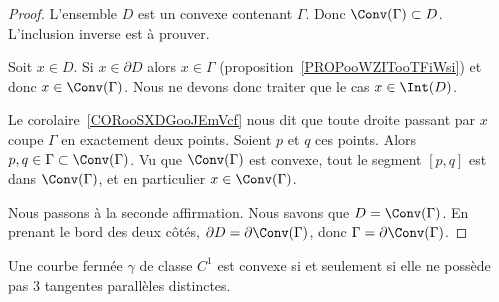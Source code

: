\begin{proof}
	L'ensemble \( D\) est un convexe contenant \( \Gamma\). Donc \( \Conv(\Gamma)\subset D\). L'inclusion inverse est à prouver.

	Soit \( x\in D\). Si \( x\in \partial D\) alors \( x\in \Gamma\) (proposition~\ref{PROPooWZITooTFiWsi}) et donc \( x\in\Conv(\Gamma)\). Nous ne devons donc traiter que le cas \( x\in\Int(D)\).

	Le corolaire~\ref{CORooSXDGooJEmVcf} nous dit que toute droite passant par \( x\) coupe \( \Gamma\) en exactement deux points. Soient \( p\) et \( q\) ces points. Alors \( p,q\in \Gamma\subset \Conv(\Gamma)\). Vu que \( \Conv(\Gamma) \) est convexe, tout le segment \( [p,q]\) est dans \( \Conv(\Gamma)\), et en particulier \( x\in\Conv(\Gamma)\).

	Nous passons à la seconde affirmation. Nous savons que \( D=\Conv(\Gamma)\). En prenant le bord des deux côtés, \( \partial D=\partial\Conv(\Gamma)\), donc \( \Gamma=\partial\Conv(\Gamma)\).
\end{proof}

\begin{lemma}        \label{LEMooUEKQooWhGyKn}
	Une courbe fermée \( \gamma\) de classe \( C^1\) est convexe si et seulement si elle ne possède pas \( 3\) tangentes parallèles distinctes.
\end{lemma}

